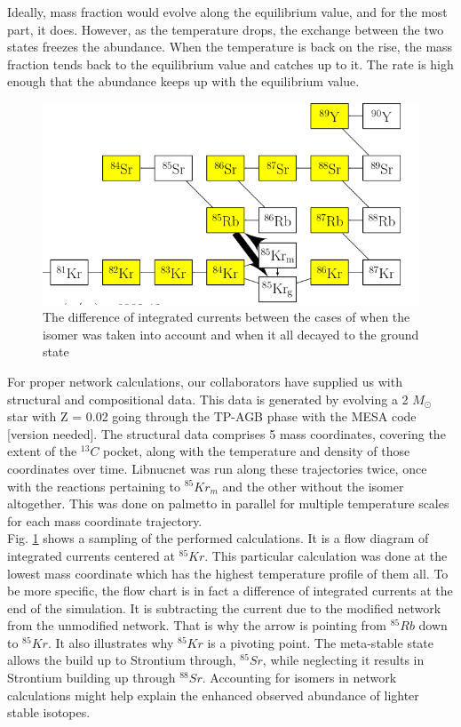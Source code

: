 \documentclass{article}
\begin{document}
Ideally, mass fraction would evolve along the equilibrium value, and for the most part, it does. However, as the temperature drops, 
the exchange between the two states freezes the abundance. When the temperature is back on the rise, the mass fraction tends back to 
the equilibrium value and catches up to it. The rate is high enough that the abundance keeps up with the equilibrium value.\\

\begin{figure}[H]
    \centerline{\includegraphics[scale = 0.5]{images/sample_branch.png}}
    \caption{The difference of integrated currents between the cases of when the isomer was taken into account and when it all decayed to the ground state}
    \label{int_cur}
\end{figure}

For proper network calculations, our collaborators have supplied us with structural and compositional data. This data is generated 
by evolving a 2 $M_{\odot}$ star with Z = 0.02 going through the TP-AGB phase with the MESA code [version needed]\cite{paxton2010modules,paxton2013modules,paxton2015modules,paxton2018modules,paxton2019modules}.
The structural data comprises 5 mass coordinates, covering the extent of the $^{13}C$ pocket, along with the temperature and density 
of those coordinates over time. Libnucnet was run along these trajectories twice, once with the reactions pertaining to $^{85}Kr_{m}$ 
and the other without the isomer altogether. This was done on palmetto in parallel for multiple temperature scales for each mass 
coordinate trajectory.\\

Fig. \ref{int_cur} shows a sampling of the performed calculations. It is a flow diagram of integrated currents centered at $^{85}Kr$. 
This particular calculation was done at the lowest mass coordinate which has the highest temperature profile of them all. To be more 
specific, the flow chart is in fact a difference of integrated currents at the end of the simulation. It is subtracting the current 
due to the modified network from the unmodified network. That is why the arrow is pointing from $^{85}Rb$ down to $^{85}Kr$. It 
also illustrates why $^{85}Kr$ is a pivoting point. The meta-stable state allows the build up to Strontium through, $^{85}Sr$, while 
neglecting it results in Strontium building up through $^{88}Sr$. Accounting for isomers in network calculations might help explain 
the enhanced observed abundance of lighter stable isotopes.
\end{document}
